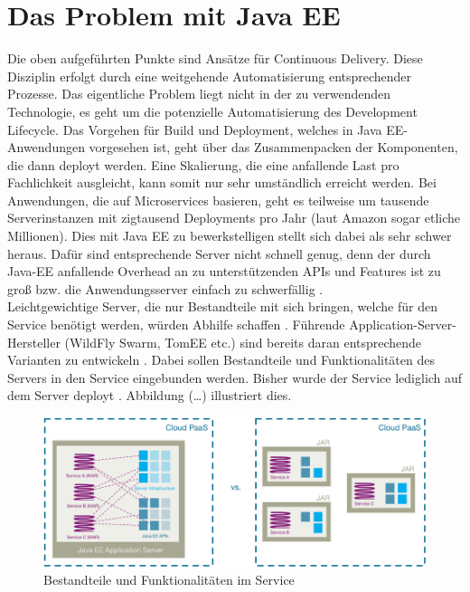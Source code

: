 \section{Das Problem mit Java EE}
Die oben aufgeführten Punkte sind Ansätze für Continuous Delivery. Diese Disziplin erfolgt durch eine weitgehende Automatisierung entsprechender Prozesse. Das eigentliche Problem liegt nicht in der zu verwendenden Technologie, es geht um die potenzielle Automatisierung des Development Lifecycle. Das Vorgehen für Build und Deployment, welches in Java EE-Anwendungen vorgesehen ist, geht über das Zusammenpacken der Komponenten, die dann deployt werden. Eine Skalierung, die eine anfallende Last pro Fachlichkeit ausgleicht, kann somit nur sehr umständlich erreicht werden. Bei Anwendungen, die auf Microservices basieren, geht es teilweise um tausende Serverinstanzen mit zigtausend Deployments pro Jahr (laut Amazon sogar etliche Millionen). Dies mit Java EE zu bewerkstelligen stellt sich dabei als sehr schwer heraus. Dafür sind entsprechende Server nicht schnell genug, denn der durch Java-EE anfallende Overhead an zu unterstützenden APIs und Features ist zu groß bzw. die Anwendungsserver einfach zu schwerfällig  \cite{jaxcenter.2016}. \\ 
Leichtgewichtige Server, die nur Bestandteile mit sich bringen, welche für den Service benötigt werden, würden Abhilfe schaffen \cite{jaxcenter.2016}. Führende Application-Server-Hersteller (WildFly Swarm, TomEE etc.) sind bereits daran entsprechende Varianten zu entwickeln \cite{LarsRowekamp.2016}. Dabei sollen Bestandteile und Funktionalitäten des Servers in den Service eingebunden werden. Bisher wurde der Service lediglich auf dem Server deployt \cite{jaxcenter.2016}. Abbildung (…) illustriert dies.
\begin{figure}[h!]
	\centering
	\includegraphics[width=1.0\linewidth]{images/mp}
	\caption{Bestandteile und Funktionalitäten im Service \cite{jaxcenter.2016}}
	\label{fig:mp}
\end{figure}
